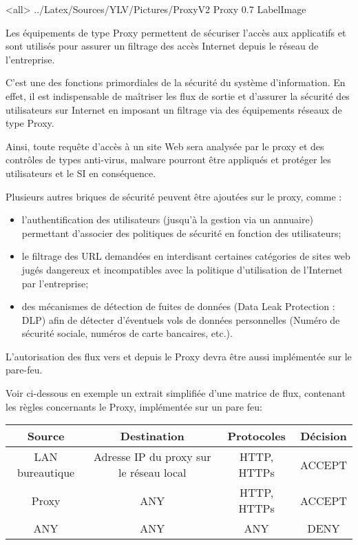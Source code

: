 \mode<all>{\picframe
{../Latex/Sources/YLV/Pictures/ProxyV2}%
{Proxy} %
{0.7} %
{LabelImage} %
}

Les équipements de type Proxy permettent de sécuriser l'accès aux applicatifs et sont utilisés pour assurer un filtrage des accès Internet depuis le réseau de l'entreprise.

C'est une des fonctions primordiales de la sécurité du système d'information.
En effet, il est indispensable de maîtriser les flux de sortie et d'assurer la sécurité des utilisateurs sur Internet en imposant un filtrage via des équipements réseaux de type Proxy. 

Ainsi, toute requête d'accès à un site Web sera analysée par le proxy et des contrôles de types anti-virus, malware pourront être appliqués et protéger les utilisateurs et le SI en conséquence.

Plusieurs autres briques de sécurité peuvent être ajoutées sur le proxy, comme :
\begin{itemize}
    \item l'authentification des utilisateurs (jusqu'à la gestion via un annuaire) permettant d'associer des politiques de sécurité en fonction des utilisateurs;
    \item le filtrage des URL demandées en interdisant certaines catégories de sites web jugés dangereux et incompatibles avec la politique d'utilisation de l'Internet par l'entreprise;
    \item des mécanismes de détection de fuites de données (Data Leak Protection : DLP) afin de détecter d'éventuels vols de données personnelles (Numéro de sécurité sociale, numéros de carte bancaires, etc.).
\end{itemize}

L'autorisation des flux vers et depuis le Proxy devra être aussi implémentée sur le pare-feu.

Voir ci-dessous en exemple un extrait simplifiée d'une matrice de flux, contenant les règles concernants le Proxy, implémentée sur un pare feu:

\begin{center}
\begin{tabular}{||c c c c||} 
 \hline
 Source & Destination & Protocoles & Décision \\ [0.5ex] 
 \hline\hline
 LAN bureautique & Adresse IP du proxy sur le réseau local & HTTP, HTTPs & ACCEPT \\ 
 \hline
 Proxy & ANY & HTTP, HTTPs & ACCEPT \\
 \hline
 ANY & ANY & ANY & DENY \\
 \hline
\end{tabular}
\end{center}

